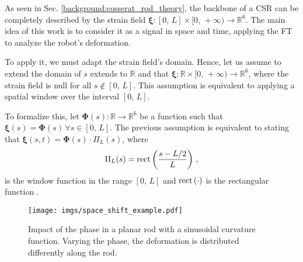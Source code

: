 As seen in Sec. \ref{background:cosserat_rod_theory}, the backbone of a \ac{CSR} can be completely described by the strain field $\bm{\xi}: [0, \, L] \times [0, \, +\infty) \rightarrow \mathbb{R}^6$. The main idea of this work is to consider it as a signal in space and time, applying the \ac{FT} to analyze the robot’s deformation.

To apply it, we must adapt the strain field's domain. Hence, let us assume to extend the domain of $s$ extends to $\mathbb{R}$ and that $\bm{\xi}: \mathbb{R} \times [0, \, +\infty) \rightarrow \mathbb{R}^{6}$, where the strain field is null for all $s \notin [0, \, L]$. This assumption is equivalent to applying a spatial window over the interval $[0, \, L]$.

To formalize this, let $\bm{\Phi}(s): \mathbb{R} \rightarrow \mathbb{R}^6$ be a function such that $\bm{\xi}(s) = \bm{\Phi}(s) \, \forall s \in [0, \, L]$. 
The previous assumption is equivalent to stating that $\bm{\xi}(s, t) = \bm{\Phi}(s) \cdot \Pi_L(s)$, where
\begin{equation} \label{eq:length_space_window}
    \Pi_L(s) = \textnormal{rect}\left(\frac{s - L/2}{L}\right) \, ,
\end{equation}
is the window function in the range $[0, \, L]$ and $\textnormal{rect}\left(\cdot\right)$ is the rectangular function \cite[Ch. 4]{bracewell2007fourier}.
%     
\begin{figure}
    \centering
    \texttt{[image: imgs/space\_shift\_example.pdf]}
    \caption{Impact of the phase in a planar rod with a sinusoidal curvature function. Varying the phase, the deformation is distributed differently along the rod.}
    \label{fig:space_shift_example}
\end{figure}
%
